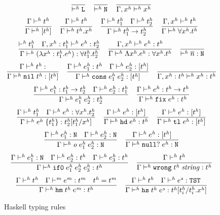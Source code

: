 \begin{figure}[p]
\[
\frac
{}
{ \vdash^{\mathit{h}} \mathtt{L}}
\quad
\frac
{}
{ \vdash^{\mathit{h}} \mathtt{N}}
\quad
\frac
{}
{\Gamma , x^{\mathit{h}} \vdash^{\mathit{h}} x^{\mathit{h}}}
\]
\[
\frac
{\Gamma \vdash^{\mathit{h}} t^{\mathit{h}}}
{\Gamma \vdash^{\mathit{h}} [t^{\mathit{h}}]}
\quad
\frac
{\Gamma \vdash^{\mathit{h}} t^{\mathit{h}}}
{\Gamma \vdash^{\mathit{h}} t^{\mathit{h}} . x^{\mathit{h}}}
\quad
\frac
{\Gamma \vdash^{\mathit{h}} t^{\mathit{h}}_{1} \quad \Gamma \vdash^{\mathit{h}} t^{\mathit{h}}_{2}}
{\Gamma \vdash^{\mathit{h}} t^{\mathit{h}}_{1} \rightarrow t^{\mathit{h}}_{2}}
\quad
\frac
{\Gamma, x^{\mathit{h}} \vdash^{\mathit{h}} t^{\mathit{h}}}
{\Gamma \vdash^{\mathit{h}} \forall x^{\mathit{h}} . t^{\mathit{h}}}
\]
\bigskip
\[
\frac
{ \vdash^{\mathit{h}} t^{\mathit{h}}_{1} \quad \Gamma , x^{\mathit{h}} : t^{\mathit{h}}_{1} \vdash^{\mathit{h}} e^{\mathit{h}} : t^{\mathit{h}}_{2}}
{\Gamma \vdash^{\mathit{h}} (\lambda x^{\mathit{h}} : t^{\mathit{h}}_{1} . e^{\mathit{h}}) : \forall t^{\mathit{h}}_{1} . t^{\mathit{h}}_{2}}
\quad
\frac
{\Gamma , x^{\mathit{h}} \vdash^{\mathit{h}} e^{\mathit{h}} : t^{\mathit{h}}}
{\Gamma \vdash^{\mathit{h}} \Lambda x^{\mathit{h}} . e^{\mathit{h}} : \forall x^{\mathit{h}} . t^{\mathit{h}}}
\quad
\frac
{}
{ \vdash^{\mathit{h}} \overline{n} : \mathtt{N}}
\]
\[
\frac
{\judeh{\env}{\vartyh}}
{\judeh{\env}{\expnils{\vartyh}}{\tylist{\vartyh}}}
\quad
\frac
{\judeh{\env}{\first{\varexph}}{\vartyh} \quad \judeh{\env}{\second{\varexph}}{\tylist{\vartyh}}}
{\judeh{\env}{\expcons{\first{\varexph}}{\second{\varexph}}}{\tylist{\vartyh}}}
\quad
\frac
{}
{\judeh{\envexte{\varvarh}{\vartyh}}{\varvarh}{\vartyh}}
\]
\[
\frac
{\Gamma \vdash^{\mathit{h}} e^{\mathit{h}}_{1} : t^{\mathit{h}}_{1} \rightarrow t^{\mathit{h}}_{2} \quad \Gamma \vdash^{\mathit{h}} e^{\mathit{h}}_{2} : t^{\mathit{h}}_{1}}
{\Gamma\vdash^{\mathit{h}}e^{\mathit{h}}_{1} \; e^{\mathit{h}}_{2}:t^{\mathit{h}}_{2}}
\quad
\frac
{\Gamma \vdash^{\mathit{h}} e^{\mathit{h}} : t^{\mathit{h}} \rightarrow t^{\mathit{h}}}
{\Gamma \vdash^{\mathit{h}} \mathtt{fix} \; e^{\mathit{h}} : t^{\mathit{h}}}
\]
\[
\frac
{\Gamma \vdash^{\mathit{h}} t^{\mathit{h}}_{1} \quad \Gamma \vdash^{\mathit{h}} e^{\mathit{h}} : \forall x^{\mathit{h}} . t^{\mathit{h}}_{2}}
{\Gamma \vdash^{\mathit{h}} e^{\mathit{h}} \; \lbrace t^{\mathit{h}}_{1} \rbrace : t^{\mathit{h}}_{2}[t^{\mathit{h}}_{1}/x^{\mathit{h}}]}
\quad
\frac
{\Gamma \vdash^{\mathit{h}} e^{\mathit{h}} : [t^{\mathit{h}}]}
{\Gamma \vdash^{\mathit{h}} \mathtt{hd} \; e^{\mathit{h}} : t^{\mathit{h}}}
\quad
\frac
{\Gamma \vdash^{\mathit{h}} e^{\mathit{h}} : [t^{\mathit{h}}]}
{\Gamma \vdash^{\mathit{h}} \mathtt{tl} \; e^{\mathit{h}} : [t^{\mathit{h}}]}
\]
\[
\frac
{\Gamma \vdash^{\mathit{h}} e^{\mathit{h}}_{1} : \mathtt{N} \quad \Gamma \vdash^{\mathit{h}} e^{\mathit{h}}_{2} : \mathtt{N}}
{\Gamma \vdash^{\mathit{h}} \mathit{o} \; e^{\mathit{h}}_{1} \; e^{\mathit{h}}_{2} : \mathtt{N}}
\quad
\frac
{\Gamma \vdash^{\mathit{h}} e^{\mathit{h}} : [t^{\mathit{h}}]}
{\Gamma \vdash^{\mathit{h}} \mathtt{null?} \; e^{\mathit{h}} : \mathtt{N}}
\]
\[
\frac
{\Gamma \vdash^{\mathit{h}} e^{\mathit{h}}_{1} : \mathtt{N} \quad \Gamma \vdash^{\mathit{h}} e^{\mathit{h}}_{2} : t^{\mathit{h}} \quad \Gamma \vdash^{\mathit{h}} e^{\mathit{h}}_{3} : t^{\mathit{h}}}
{\Gamma \vdash^{\mathit{h}} \mathtt{if0} \; e^{\mathit{h}}_{1} \; e^{\mathit{h}}_{2} \; e^{\mathit{h}}_{3} : t^{\mathit{h}}}
\quad
\frac
{\Gamma \vdash^{\mathit{h}} t^{\mathit{h}}}
{\Gamma \vdash^{\mathit{h}} \mathtt{wrong} \; t^{\mathit{h}} \; \mathit{string} : t^{\mathit{h}}}
\]
\[
\frac
{\Gamma \vdash^{\mathit{h}} t^{\mathit{h}} \quad \Gamma \vdash^{\mathit{m}} e^{\mathit{m}} : t^{\mathit{m}} \quad t^{\mathit{h}}=t^{\mathit{m}}}
{\Gamma \vdash^{\mathit{h}} \mathtt{hm} \; t^{\mathit{h}} \; e^{\mathit{m}} : t^{\mathit{h}}}
\quad
\frac
{\Gamma \vdash^{\mathit{h}} t^{\mathit{h}} \quad \Gamma \vdash^{\mathit{h}} e^{\mathit{s}} : \mathtt{TST}}
{\Gamma \vdash^{\mathit{h}} \mathtt{hs} \; t^{\mathit{h}} \; e^{\mathit{s}} : t^{\mathit{h}}[t^{\mathit{h}}_{i}/t^{\mathit{h}}_{i} . x^{\mathit{h}}]}
\]
\caption{Haskell typing rules}
\label{htr}
\end{figure}
